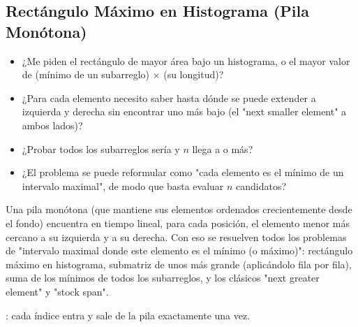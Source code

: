 \subsection{Rectángulo Máximo en Histograma (Pila Monótona)}
\label{alg:3-7}


\begin{itemize}
\item ¿Me piden el rectángulo de mayor área bajo un histograma, o el mayor valor de (mínimo de un subarreglo) $\times$ (su longitud)?
\item ¿Para cada elemento necesito saber hasta dónde se puede extender a izquierda y derecha sin encontrar uno más bajo (el "next smaller element" a ambos lados)?
\item ¿Probar todos los subarreglos sería  y $n$ llega a  o más?
\item ¿El problema se puede reformular como "cada elemento es el mínimo de un intervalo maximal", de modo que basta evaluar $n$ candidatos?
\end{itemize}

 Una pila monótona (que mantiene sus elementos ordenados crecientemente desde el fondo) encuentra en tiempo lineal, para cada posición, el elemento menor más cercano a su izquierda y a su derecha. Con eso se resuelven todos los problemas de "intervalo maximal donde este elemento es el mínimo (o máximo)": rectángulo máximo en histograma, submatriz de unos más grande (aplicándolo fila por fila), suma de los mínimos de todos los subarreglos, y los clásicos "next greater element" y "stock span".

 : cada índice entra y sale de la pila exactamente una vez.

